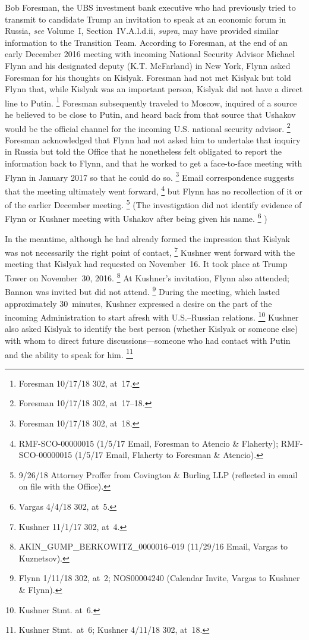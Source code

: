 Bob Foresman, the UBS investment bank executive who had previously tried to transmit to candidate Trump an invitation to speak at an economic forum in Russia, \textit{see} Volume~I, Section~IV.A.l.d.ii, \textit{supra}, may have provided similar information to the Transition Team.
According to Foresman, at the end of an early December 2016 meeting with incoming National Security Advisor Michael Flynn and his designated deputy (K.T. McFarland) in New York, Flynn asked Foresman for his thoughts on Kislyak.
Foresman had not met Kislyak but told Flynn that, while Kislyak was an important person, Kislyak did not have a direct line to Putin.%
\footnote{Foresman 10/17/18 302, at~17.}
Foresman subsequently traveled to Moscow, inquired of a source he believed to be close to Putin, and heard back from that source that Ushakov would be the official channel for the incoming U.S. national security advisor.%
\footnote{Foresman 10/17/18 302, at~17--18.}
Foresman acknowledged that Flynn had not asked him to undertake that inquiry in Russia but told the Office that he nonetheless felt obligated to report the information back to Flynn, and that he worked to get a face-to-face meeting with Flynn in January 2017 so that he could do so.%
\footnote{Foresman 10/17/18 302, at~18.}
Email correspondence suggests that the meeting ultimately went forward,%
\footnote{RMF-SCO-00000015 (1/5/17 Email, Foresman to Atencio \& Flaherty);
RMF-SCO-00000015 (1/5/17 Email, Flaherty to Foresman \& Atencio).}
but Flynn has no recollection of it or of the earlier December meeting.%
\footnote{9/26/18 Attorney Proffer from Covington \& Burling LLP (reflected in email on file with the Office).}
(The investigation did not identify evidence of Flynn or Kushner meeting with Ushakov after being given his name.%
\footnote{Vargas 4/4/18 302, at~5.}%
)

In the meantime, although he had already formed the impression that Kislyak was not necessarily the right point of contact,%
\footnote{Kushner 11/1/17 302, at~4.}
Kushner went forward with the meeting that Kislyak had requested on November~16. It took place at Trump Tower on November~30, 2016.%
\footnote{AKIN\_GUMP\_BERKOWITZ\_0000016--019 (11/29/16 Email, Vargas to Kuznetsov).}
At Kushner's invitation, Flynn also attended; Bannon was invited but did not attend.%
\footnote{Flynn 1/11/18 302, at~2;
NOS00004240 (Calendar Invite, Vargas to Kushner \& Flynn).}
During the meeting, which lasted approximately 30~minutes, Kushner expressed a desire on the part of the incoming Administration to start afresh with U.S.--Russian relations.%
\footnote{Kushner Stmt. at~6.}
Kushner also asked Kislyak to identify the best person (whether Kislyak or someone else) with whom to direct future discussions---someone who had contact with Putin and the ability to speak for him.%
\footnote{Kushner Stmt.\ at~6;
Kushner 4/11/18 302, at~18.}

